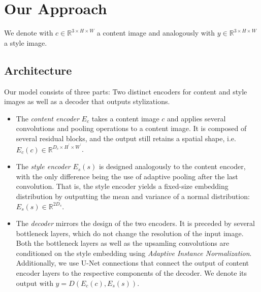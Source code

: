 \documentclass[10pt,twocolumn,letterpaper]{article}
\begin{document}
\section{Our Approach}

We denote with $c \in \mathbb{R}^{3 \times H \times W}$ a content image and analogously with $y \in \mathbb{R}^{3 \times H \times W}$ a style image.

\subsection{Architecture}

Our model consists of three parts: Two distinct encoders for content and style images as well as a decoder that outputs stylizations.
\begin{itemize}
	\item The \textit{content encoder} $E_c$ takes a content image $c$ and applies several convolutions and pooling operations to a content image. It is composed of several residual blocks, and the output still retains a spatial shape, i.e. $E_c(c) \in \mathbb{R}^{D_c \times H^\prime \times W^\prime}$.
	\item The \textit{style encoder} $E_s(s)$ is designed analogously to the content encoder, with the only difference being the use of adaptive pooling after the last convolution. That is, the style encoder yields a fixed-size embedding distribution by outputting the mean and variance of a normal distribution: $E_s(s) \in \mathbb{R}^{2D_s}$.
	\item The \textit{decoder} mirrors the design of the two encoders. It is preceded by several bottleneck layers, which do not change the resolution of the input image. Both the bottleneck layers as well as the upsamling convolutions are conditioned on the style embedding using \textit{Adaptive Instance Normalization}. Additionally, we use U-Net connections that connect the output of content encoder layers to the respective components of the decoder. We denote its output with $y = D(E_c(c), E_s(s))$.
\end{itemize}
	
\end{document}
